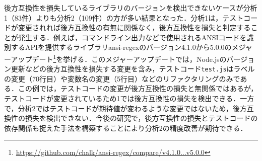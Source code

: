 \documentclass[submit]{ipsj}
\newcommand{\todo}[1]{\colorbox{yellow}{{\bf TODO}:}{\color{red} {\textbf{[#1]}}}}
\begin{document}
{\textcolor{red}{}後方互換性を損失しているライブラリのバージョンを検出できないケースが分析1（83件）よりも分析2（109件）の方が多い結果となった．分析1は，テストコードが変更されれば後方互換性の有無に関係なく，後方互換性を損失と判定することが発生する．例えば，コマンドライン出力などで使用されるANSIコードを識別するAPIを提供するライブラリansi-regexのバージョン4.1.0から5.0.0のメジャーアップデート\footnote{\url{https://github.com/chalk/ansi-regex/compare/v4.1.0...v5.0.0}}を挙げる．このメジャーアップデートでは，Node.jsのバージョン更新などの後方互換性を損失する変更を含み，テストコード\verb|test.js|はラベルの変更（70行目）や変数名の変更（5行目）などのリファクタリングのみである．この例では，テストコードの変更が後方互換性の損失と無関係ではあるが，テストコードが変更されているため\textcolor{red}{}1では後方互換性の損失を検出できる．一方で，分析2ではテストコードが期待値が変わるような変更ではないため，後方互換性の損失を検出できない．今後の研究で，後方互換性の損失とテストコードの依存関係も捉えた手法を構築することにより分析2の精度改善が期待できる．





}
\end{document}
